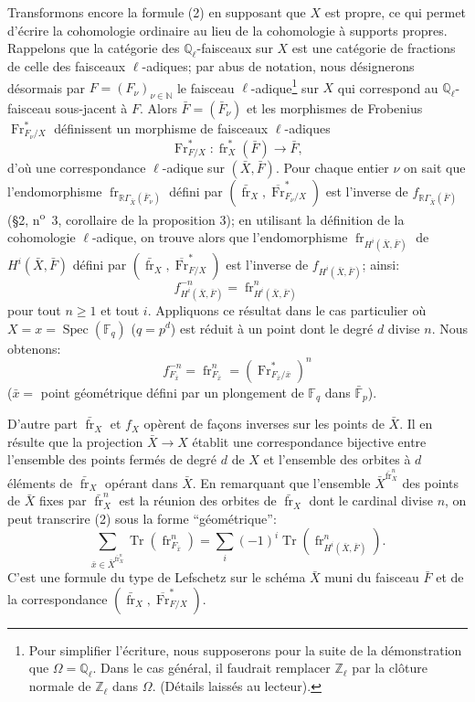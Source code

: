 \documentclass[11pt]{article}
\DeclareMathOperator{\Spec}{Spec}
\newcommand{\R}{\mathbb{R}}\newcommand{\RHomCore}{\mathbb{R}\mathrm{Hom}}
\providecommand{\Tr}{\operatorname{Tr}}
\providecommand{\Tr}{\operatorname{Tr}}
\providecommand{\Tr}{\operatorname{Tr}}
\providecommand{\R}{\mathrm R}
\providecommand{\Tr}{\operatorname{Tr}}
\providecommand{\Spec}{\operatorname{Spec}}
\providecommand{\Spec}{\operatorname{Spec}}
\providecommand{\Spec}{\operatorname{Spec}}
\providecommand{\Tr}{\operatorname{Tr}}
\providecommand{\fr}{\operatorname{fr}}
\providecommand{\Fr}{\operatorname{Fr}}
\providecommand{\Fr}{\operatorname{Fr}}
\providecommand{\fr}{\operatorname{fr}}
\providecommand{\Spec}{\operatorname{Spec}}
\begin{document}
Transformons encore la formule (2) en supposant que $X$ est propre, ce qui permet d'écrire la cohomologie ordinaire au lieu de la cohomologie à supports propres. Rappelons que la catégorie des $\mathbb Q_\ell$-faisceaux sur $X$ est une catégorie de fractions de celle des faisceaux $\ell$-adiques; par abus de notation, nous désignerons désormais par $F=(F_\nu)_{\nu\in\mathbb N}$ le faisceau $\ell$-adique\footnote{Pour simplifier l'écriture, nous supposerons pour la suite de la démonstration que $\Omega=\mathbb Q_\ell$. Dans le cas général, il faudrait remplacer $\mathbb Z_\ell$ par la clôture normale de $\mathbb Z_\ell$ dans $\Omega$. (Détails laissés au lecteur).} sur $X$ qui correspond au $\mathbb Q_\ell$-faisceau sous-jacent à $F$. Alors $\bar F=(\bar F_\nu)$ et les morphismes de Frobenius $\Fr^*_{F_\nu/X}$ définissent un morphisme de faisceaux $\ell$-adiques
\[
\Fr^*_{F/X}:\fr_X^*(\bar F)\longrightarrow\bar F,
\]
d'où une correspondance $\ell$-adique sur $(\bar X,\bar F)$. Pour chaque entier $\nu$ on sait que l'endomorphisme $\fr_{\R\Gamma_{\bar X}(\bar F_\nu)}$ défini par $(\bar{\fr}_X,\overline{\Fr}^*_{F_\nu/X})$ est l'inverse de $f_{\R\Gamma_{\bar X}(\bar F)}$ (§2, n\textsuperscript{o}~3, corollaire de la proposition 3); en utilisant la définition de la cohomologie $\ell$-adique, on trouve alors que l'endomorphisme $\fr_{H^i(\bar X,\bar F)}$ de $H^i(\bar X,\bar F)$ défini par $(\bar{\fr}_X,\overline{\Fr}^*_{F/X})$ est l'inverse de $f_{H^i(\bar X,\bar F)}$; ainsi:
\[
f^{-n}_{H^i(\bar X,\bar F)}=\fr^n_{H^i(\bar X,\bar F)}
\]
pour tout $n\ge1$ et tout $i$.
Appliquons ce résultat dans le cas particulier où $X=x=\Spec(\mathbb F_q)$ ($q=p^d$) est réduit à un point dont le degré $d$ divise $n$. Nous obtenons:
\[
f^{-n}_{F_{\bar x}}=\fr^n_{F_{\bar x}}=(\Fr^*_{F_{\bar x}/\bar x})^n
\]
($\bar x=$ point
géométrique défini par un plongement de $\mathbb F_q$ dans $\bar{\mathbb F}_p$).

D'autre part $\bar{\fr}_X$ et $f_X$ opèrent de façons inverses sur les points de $\bar X$. Il en résulte que la projection $\bar X\to X$ établit une correspondance bijective entre l'ensemble des points fermés de degré $d$ de $X$ et l'ensemble des orbites à $d$ éléments de $\bar{\fr}_X$ opérant dans $\bar X$. En remarquant que l'ensemble $\bar X^{\bar{\fr}_X^n}$ des points de $\bar X$ fixes par $\bar{\fr}_X^n$ est la réunion des orbites de $\bar{\fr}_X$ dont le cardinal divise $n$, on peut transcrire (2) sous la forme ``géométrique'':
\[
\sum_{\bar x\in\bar X^{\bar{\fr}_X^n}}\Tr(\fr^n_{F_{\bar x}})
=\sum_i(-1)^i\Tr(\fr^n_{H^i(\bar X,\bar F)}).
\tag{2'}
\]
C'est une formule du type de Lefschetz sur le schéma $\bar X$ muni du faisceau $\bar F$ et de la correspondance $(\bar{\fr}_X,\overline{\Fr}^*_{F/X})$.
\end{document}
